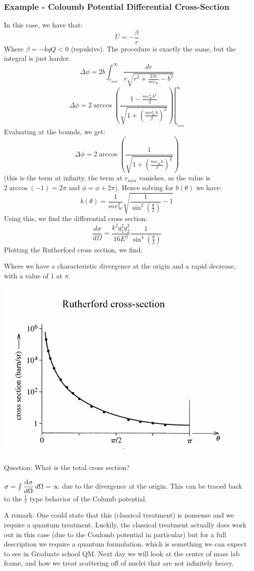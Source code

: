 \subsubsection{Example - Coloumb Potential Differential Cross-Section}
In this case, we have that:
\[U = -\frac{\beta}{r}\]
Where $\beta = -kqQ < 0$ (repulsive). The procedure is exactly the same, but the integral is just harder. 
\[\Delta \phi = 2b\int_{r_{min}}^\infty \frac{dr}{r\sqrt{r^2 + \frac{2\beta r}{mv_{\infty}} - b^2}}\]
\[\Delta \phi = \left.2\arccos(\frac{1 - \frac{mv_\infty^2 b^2}{\beta}}{\sqrt{1 + \left(\frac{mv_{\infty}^2b}{\beta}\right)^2}})\right|_{r_{min}}^{\infty}\]
Evaluating at the bounds, we get:
\[\Delta \phi = 2\arccos(\frac{1}{\sqrt{1 + \left(\frac{mv_\infty b}{\beta}\right)^2}})\]
(this is the term at infinity, the term at $r_{min}$ vanishes, as the value is $2\arccos(-1) = 2\pi$ and $\phi = \phi + 2\pi$). Hence solving for $b(\theta)$ we have:
\[b(\theta) = \frac{1}{mv_{\infty}^2}\sqrt{\frac{1}{\sin^2(\frac{\theta}{2})} - 1}\]
Using this, we find the differential cross section:
\[\frac{d\sigma}{d\Omega} = \frac{k^2q_1^2q_2^2}{16E^2}\frac{1}{\sin^4(\frac{\theta}{2})}\]
Plotting the Rutherford cross section, we find:

Where we have a characteristic divergence at the origin and a rapid decrease, with a value of $1$ at $\pi$. 
\begin{center}
    \includegraphics[scale=0.5]{Lecture-28/l28-img3.png}
\end{center}
Question: What is the total cross section?
\begin{s}
$\sigma = \int\dod{\sigma}{\Omega}d\Omega = \infty$ due to the divergence at the origin. This can be traced back to the $\frac{1}{r}$ type behavior of the Columb potential. 
\end{s}
A remark: One could state that this (classical treatment) is nonsense and we require a quantum treatment. Luckily, the classical treatment actually does work out in this case (due to the Coulomb potential in particular) but for a full description we require a quantum formulation, which is something we can expect to see in Graduate school QM. Next day we will look at the center of mass lab frame, and how we treat scattering off of nuclei that are not infinitely heavy. 